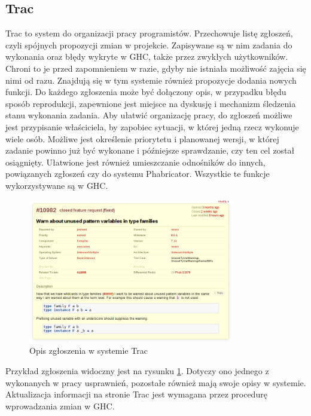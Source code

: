 \subsection{Trac}

Trac to system do organizacji pracy programistów. Przechowuje listę zgłoszeń, czyli spójnych propozycji zmian w projekcie. Zapisywane są w nim zadania do wykonania oraz błędy wykryte w GHC, także przez zwykłych użytkowników. Chroni to je przed zapomnieniem w razie, gdyby nie istniała możliwość zajęcia się nimi od razu. Znajdują się w tym systemie również propozycje dodania nowych funkcji. Do każdego zgłoszenia może być dołączony opis, w przypadku błędu sposób reprodukcji, zapewnione jest miejsce na dyskusję i mechanizm śledzenia stanu wykonania zadania. Aby ułatwić organizację pracy, do zgłoszeń możliwe jest przypisanie właściciela, by zapobiec sytuacji, w której jedną rzecz wykonuje wiele osób. Możliwe jest określenie priorytetu i planowanej wersji, w której zadanie powinno już być wykonane i późniejsze sprawdzanie, czy ten cel został osiągnięty. Ułatwione jest również umieszczanie odnośników do innych, powiązanych zgłoszeń czy do systemu Phabricator. Wszystkie te funkcje wykorzystywane są w GHC.

\begin{figure}[ht]
    \centering
    \includegraphics[width=0.8\textwidth]{images/Trac_description}
    \caption{Opis zgłoszenia w systemie Trac}
    \label{fig:Trac_description}
\end{figure}

Przykład zgłoszenia widoczny jest na rysunku \ref{fig:Trac_description}. Dotyczy ono jednego z wykonanych w pracy usprawnień, pozostałe również mają swoje opisy w systemie. Aktualizacja informacji na stronie Trac jest wymagana przez procedurę wprowadzania zmian w GHC\cite{WikiFixingBugs}.

